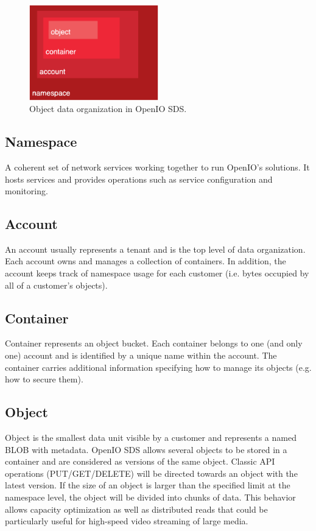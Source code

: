     \begin{figure}[hbt]
        \centering
        \includegraphics[width=0.5\textwidth]{obrazky-figures/openio-data-organization.eps}
        \caption{Object data organization in OpenIO SDS.\cite{oioCoreSolution}}
        \label{fig:oioDataOrganization}
    \end{figure}

    \subsection{Namespace}
    A coherent set of network services working together to run OpenIO's solutions. It hosts services and provides operations such as service configuration and monitoring.

    \subsection{Account}
    An account usually represents a tenant and is the top level of data organization. Each account owns and manages a collection of containers. In addition, the account keeps track of namespace usage for each customer (i.e. bytes occupied by all of a customer's objects)\cite{oioCoreSolution}.

    \subsection{Container}
    Container represents an object bucket. Each container belongs to one (and only one) account and is identified by a unique name within the account. The container carries additional information specifying how to manage its objects (e.g. how to secure them)\cite{oioCoreSolution}.

    \subsection{Object}
    Object is the smallest data unit visible by a customer and represents a named BLOB with metadata. OpenIO SDS allows several objects to be stored in a container and are considered as versions of the same object. Classic API operations (PUT/GET/DELETE) will be directed towards an object with the latest version. If the size of an object is larger than the specified limit at the namespace level, the object will be divided into chunks of data. This behavior allows capacity optimization as well as distributed reads that could be particularly useful for high-speed video streaming of large media\cite{oioCoreSolution}.

